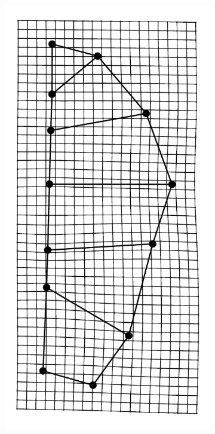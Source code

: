 \documentclass[12pt,letterpaper]{article}\usepackage{graphicx, color}
\begin{document}
\begin{figure}[ht]
  \centering
  \begin{subfigure}[b]{0.4\textwidth}
    \centering
    \includegraphics[width = \textwidth, height = 0.35\textheight, keepaspectratio = true]{figure/mshape_1}

\end{subfigure}
\end{figure}
\end{document}
